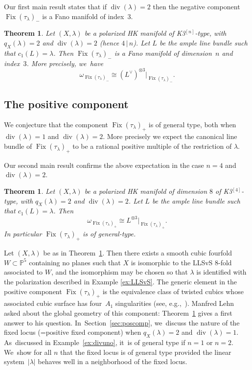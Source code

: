 \documentclass[11pt]{article}
\newcommand{\HK}{\textup{HK}\xspace}
\newcommand{\PP}{{\mathbb P}}\let\P\PP
\DeclareMathOperator{\divisore}{div}\let\div\divisore
\DeclareMathOperator{\Fix}{Fix}
\newtheorem{theo}[lemm]{Theorem}
\theoremstyle{definition}
\begin{document}
Our first main result states that if $\divisore(\lambda)=2$ then the negative component $\Fix(\tau_{\lambda})_-$ is a Fano manifold of index~3.

\begin{theo}\label{thm:main1}
Let $(X,\lambda)$ be a polarized \HK manifold of \textup{K3}$^{[n]}$-type, with $q_X(\lambda)=2$ and $\divisore(\lambda)=2$ (hence $4\,|\,n$).
Let $L$ be the ample line bundle such that $c_1(L)=\lambda$.
Then $\Fix(\tau_{\lambda})_-$ is a Fano manifold of dimension~$n$ and index~$3$. More precisely, we~have
\begin{equation}\label{canmenotre}
\omega_{\Fix(\tau_{\lambda})_-}\cong (L^{\vee})^{\otimes 3} \vert_{\Fix(\tau_{\lambda})_-}.
\end{equation}
\end{theo}

\subsection{The positive component}\label{subsec:LehnQuestion}

We conjecture that the component $\Fix(\tau_{\lambda})_+$ is of general type, both when $\divisore(\lambda)=1$ and $\divisore(\lambda)=2$.
More precisely we expect the canonical line bundle of $\Fix(\tau_{\lambda})_+$ to be a rational positive multiple of the restriction of $\lambda$.

Our second main result confirms the above expectation in the case $n=4$ and $\divisore(\lambda)=2$.

\begin{theo}\label{thm:main2}
Let $(X,\lambda)$ be a polarized \HK manifold of dimension $8$ of \textup{K3}$^{[4]}$-type, with $q_X(\lambda)=2$ and $\divisore(\lambda)=2$. Let $L$ be the ample line bundle such that $c_1(L)=\lambda$.
Then
\[
\omega_{\Fix(\tau_{\lambda})_+}\cong L^{\otimes 3}\vert_{\Fix(\tau_{\lambda})_+}.
\]
In particular $\Fix(\tau_{\lambda})_+$ is of general-type.
\end{theo}

Let $(X,\lambda)$ be as in Theorem~\ref{thm:main2}.
Then there exists a smooth cubic fourfold $W\subset\PP^5$ containing no planes such that $X$ is isomorphic to the LLSvS $8$-fold associated to $W$, and the isomorphism may be chosen so that $\lambda$ is identified with the polarization described in Example \ref{ex:LLSvS}.
The generic element in the positive component $\Fix(\tau_{\lambda})_+$ is the equivalence class of twisted cubics whose associated cubic surface has four~$A_1$ singularities (see, e.g.,~\cite{Lehn:Oberwolfach}).
Manfred Lehn asked about the global geometry of this component: Theorem~\ref{thm:main2} gives a first answer to his question. In~Section~\ref{sec:poscomp}, we~discuss the nature of the fixed locus (=positive fixed component) when $q_X(\lambda)=2$ and $\div(\lambda)=1$. As~discussed in Example~\ref{ex:divuno}, it~is of general type
if $n=1$ or $n=2$. We~show for all $n$ that the fixed locus is of general type provided the linear system~$|\lambda|$ behaves well in a neighborhood of the fixed locus.
\end{document}
